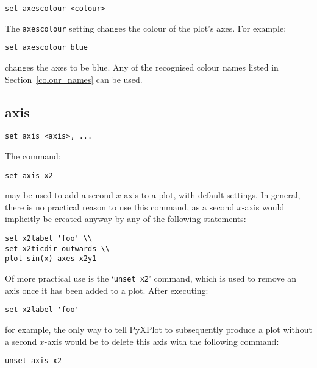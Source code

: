 \documentclass[a4paper,onecolumn,11pt]{book}
\begin{document}
\begin{verbatim}
set axescolour <colour>
\end{verbatim}

The {\tt axescolour} setting changes the colour of the plot's axes.  For example:

\begin{verbatim}
set axescolour blue
\end{verbatim}

\noindent changes the axes to be blue. Any of the recognised colour names listed in
Section~\ref{colour_names} can be used.
 

\subsection{axis}

\begin{verbatim}
set axis <axis>, ...
\end{verbatim}

The command:

\begin{verbatim}
set axis x2
\end{verbatim}

\noindent may be used to add a second $x$-axis to a plot, with default settings. In
general, there is no practical reason to use this command, as a second $x$-axis
would implicitly be created anyway by any of the following statements:

\begin{verbatim}
set x2label 'foo' \\
set x2ticdir outwards \\
plot sin(x) axes x2y1
\end{verbatim}

Of more practical use is the `{\tt unset x2}' command, which is used to remove an
axis once it has been added to a plot. After executing:

\begin{verbatim}
set x2label 'foo'
\end{verbatim}

\noindent for example, the only way to tell PyXPlot to subsequently produce a plot
without a second $x$-axis would be to delete this axis with the following
command:

\begin{verbatim}
unset axis x2
\end{verbatim}
\end{document}
